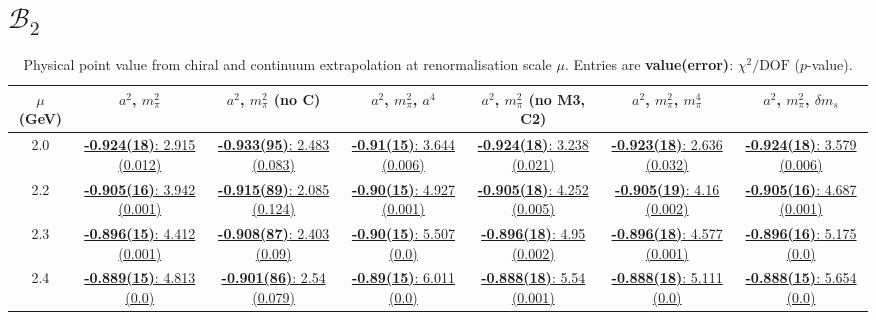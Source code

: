 \documentclass[12pt]{extarticle}
\begin{document}
\section{$\mathcal{B}_2$}
\begin{table}[h!]
\begin{center}
\begin{tabular}{|c|c|c|c|c|c|c|}
\hline
$\mu$ (GeV) & $a^2$, $m_\pi^2$& $a^2$, $m_\pi^2$ (no C)& $a^2$, $m_\pi^2$, $a^4$& $a^2$, $m_\pi^2$ (no M3, C2)& $a^2$, $m_\pi^2$, $m_\pi^4$& $a^2$, $m_\pi^2$, $\delta m_s$\\
\hline
2.0& \hyperlink{VVmAA/SUSY/a2m2_20.pdf.1}{\textbf{-0.924(18)}: 2.915 (0.012)} & \hyperlink{VVmAA/SUSY/a2m2noC_20.pdf.1}{\textbf{-0.933(95)}: 2.483 (0.083)} & \hyperlink{VVmAA/SUSY/a2a4m2_20.pdf.1}{\textbf{-0.91(15)}: 3.644 (0.006)} & \hyperlink{VVmAA/SUSY/a2m2mcut_20.pdf.1}{\textbf{-0.924(18)}: 3.238 (0.021)} & \hyperlink{VVmAA/SUSY/a2m2m4_20.pdf.1}{\textbf{-0.923(18)}: 2.636 (0.032)} & \hyperlink{VVmAA/SUSY/a2m2delm_20.pdf.1}{\textbf{-0.924(18)}: 3.579 (0.006)}\\
2.2& \hyperlink{VVmAA/SUSY/a2m2_22.pdf.1}{\textbf{-0.905(16)}: 3.942 (0.001)} & \hyperlink{VVmAA/SUSY/a2m2noC_22.pdf.1}{\textbf{-0.915(89)}: 2.085 (0.124)} & \hyperlink{VVmAA/SUSY/a2a4m2_22.pdf.1}{\textbf{-0.90(15)}: 4.927 (0.001)} & \hyperlink{VVmAA/SUSY/a2m2mcut_22.pdf.1}{\textbf{-0.905(18)}: 4.252 (0.005)} & \hyperlink{VVmAA/SUSY/a2m2m4_22.pdf.1}{\textbf{-0.905(19)}: 4.16 (0.002)} & \hyperlink{VVmAA/SUSY/a2m2delm_22.pdf.1}{\textbf{-0.905(16)}: 4.687 (0.001)}\\
2.3& \hyperlink{VVmAA/SUSY/a2m2_23.pdf.1}{\textbf{-0.896(15)}: 4.412 (0.001)} & \hyperlink{VVmAA/SUSY/a2m2noC_23.pdf.1}{\textbf{-0.908(87)}: 2.403 (0.09)} & \hyperlink{VVmAA/SUSY/a2a4m2_23.pdf.1}{\textbf{-0.90(15)}: 5.507 (0.0)} & \hyperlink{VVmAA/SUSY/a2m2mcut_23.pdf.1}{\textbf{-0.896(18)}: 4.95 (0.002)} & \hyperlink{VVmAA/SUSY/a2m2m4_23.pdf.1}{\textbf{-0.896(18)}: 4.577 (0.001)} & \hyperlink{VVmAA/SUSY/a2m2delm_23.pdf.1}{\textbf{-0.896(16)}: 5.175 (0.0)}\\
2.4& \hyperlink{VVmAA/SUSY/a2m2_24.pdf.1}{\textbf{-0.889(15)}: 4.813 (0.0)} & \hyperlink{VVmAA/SUSY/a2m2noC_24.pdf.1}{\textbf{-0.901(86)}: 2.54 (0.079)} & \hyperlink{VVmAA/SUSY/a2a4m2_24.pdf.1}{\textbf{-0.89(15)}: 6.011 (0.0)} & \hyperlink{VVmAA/SUSY/a2m2mcut_24.pdf.1}{\textbf{-0.888(18)}: 5.54 (0.001)} & \hyperlink{VVmAA/SUSY/a2m2m4_24.pdf.1}{\textbf{-0.888(18)}: 5.111 (0.0)} & \hyperlink{VVmAA/SUSY/a2m2delm_24.pdf.1}{\textbf{-0.888(15)}: 5.654 (0.0)}\\
\hline
\end{tabular}
\caption{Physical point value from chiral and continuum extrapolation at renormalisation scale $\mu$. Entries are \textbf{value(error)}: $\chi^2/\text{DOF}$ ($p$-value).}
\end{center}
\end{table}
\end{document}
